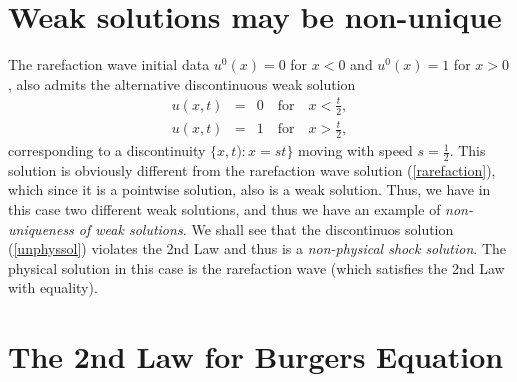 \section{Weak solutions may be non-unique}

The rarefaction wave initial data 
$u^0(x)=0$ for $x<0$ and $u^0(x)=1$ for $x>0$, also admits
the alternative discontinuous weak solution 
\begin{equation}\label{unphyssol}
\begin{array}{rcl}
u(x,t)&=& 0 \quad\mbox{for}\quad x<\frac{t}{2},\\
u(x,t)&=& 1 \quad\mbox{for}\quad x>\frac{t}{2}, 
\end{array}
\end{equation}
corresponding to a discontinuity $\{x,t):x=st\}$ moving with speed
$s=\frac{1}{2}$. This solution is obviously
different from the rarefaction wave solution
(\ref{rarefaction}), which since it is a pointwise solution, also 
is a weak solution. Thus, we have in this case two different weak solutions, 
and thus we have an example of \emph{non-uniqueness of weak solutions.}
We shall see that the discontinuos solution (\ref{unphyssol}) 
violates the 2nd Law and thus is a \emph{non-physical shock solution}.
The physical solution in this case is the rarefaction wave
(which satisfies the 2nd Law with equality).



\section{The 2nd Law for Burgers Equation}


